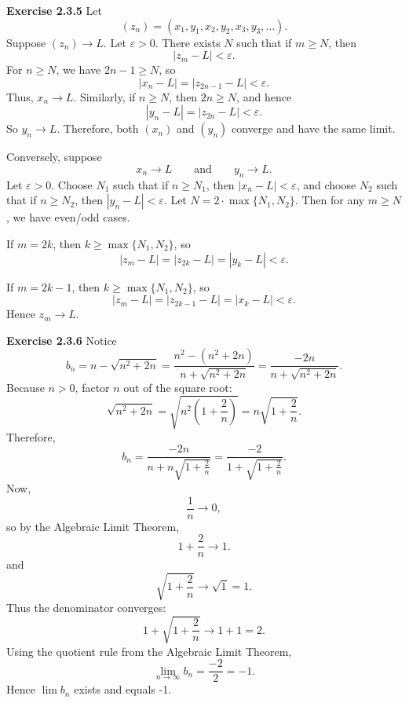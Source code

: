 \documentclass[12pt]{article}
\begin{document}
\noindent{} \textbf{Exercise 2.3.5}
Let
\[
    (z_n)=(x_1,y_1,x_2,y_2,x_3,y_3,\ldots).
\]
Suppose $(z_n) \to L$. Let $\varepsilon > 0$. There exists $N$ such that if $m \geq N$, then
\[
    |z_m - L| < \varepsilon.
\]
For $n \geq N$, we have $2n-1 \geq N$, so
\[
    |x_n - L| = |z_{2n-1} - L| < \varepsilon.
\]
Thus, $x_n \to L.$ Similarly, if \(n\ge N\), then \(2n\ge N\), and hence
\[
    |y_n-L|=|z_{2n}-L|<\varepsilon.
\]
So \(y_n\to L\).
Therefore, both \((x_n)\) and \((y_n)\) converge and have the same limit.

Conversely, suppose
\[
    x_n\to L
    \qquad\text{and}\qquad
    y_n\to L.
\]
Let $\varepsilon > 0$. Choose $N_1$ such that if $n \geq N_1$, then $|x_n - L| < \varepsilon$,
and choose $N_2$ such that if $n \geq N_2$, then $|y_n - L| < \varepsilon$.
Let $N = 2 \cdot \max\{N_1, N_2\}$. Then for any $m \geq N$, we have even/odd cases.

If $m = 2k$, then $k \geq \max\{N_1, N_2\}$, so
\[
    |z_m-L|=|z_{2k}-L|=|y_k-L|<\varepsilon.
\]

If $m = 2k-1$, then $k \geq \max\{N_1, N_2\}$, so
\[
    |z_m-L|=|z_{2k-1}-L|=|x_k-L|<\varepsilon.
\]
Hence \(z_m\to L\).


\noindent{} \textbf{Exercise 2.3.6}
Notice
\[
    b_n=n-\sqrt{n^2+2n}
    =\frac{n^2-(n^2+2n)}{n+\sqrt{n^2+2n}}
    =\frac{-2n}{n+\sqrt{n^2+2n}}.
\]
Because \(n>0\), factor \(n\) out of the square root:
\[
    \sqrt{n^2+2n}
    =
    \sqrt{n^2\left(1+\frac{2}{n}\right)}
    =
    n\sqrt{1+\frac{2}{n}}.
\]Therefore,
\[
    b_n
    =
    \frac{-2n}{n+n\sqrt{1+\frac{2}{n}}}
    =
    \frac{-2}{1+\sqrt{1+\frac{2}{n}}}.
\]Now,
\[
    \frac1n\to0,
\]so by the Algebraic Limit Theorem,
\[
    1+\frac2n\to1.
\]
and
\[
    \sqrt{1+\frac2n}\to\sqrt1=1.
\]
Thus the denominator converges:
\[
    1+\sqrt{1+\frac2n}\to 1+1=2.
\]Using the quotient rule from the Algebraic Limit Theorem,
\[
    \lim_{n\to\infty} b_n
    =
    \frac{-2}{2}
    =
    -1.
\]
Hence \(\lim b_n\) exists and equals -1.
\end{document}
